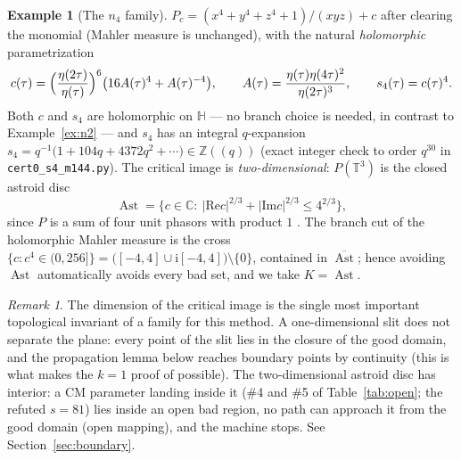 \documentclass[11pt]{article}
\newcommand{\Cc}{\mathbb{C}}
\newcommand{\Zz}{\mathbb{Z}}
\newcommand{\Hh}{\mathbb{H}}
\newcommand{\Tt}{\mathbb{T}}
\newcommand{\ii}{\mathrm{i}}
\newcommand{\ReT}{\mathrm{Re}}
\newcommand{\ImT}{\mathrm{Im}}
\DeclareMathOperator{\Ast}{Ast}
\theoremstyle{definition}
\newtheorem{example}[theorem]{Example}
\theoremstyle{remark}
\newtheorem{remark}[theorem]{Remark}
\begin{document}
\begin{example}[The $n_4$ family]\label{ex:n4}
$P_c=(x^4+y^4+z^4+1)/(xyz)+c$ after clearing the monomial (Mahler
measure is unchanged), with the natural \emph{holomorphic}
parametrization
\begin{equation}\label{eq:cdef}
  c(\tau)=\Bigl(\frac{\eta(2\tau)}{\eta(\tau)}\Bigr)^{6}
   \bigl(16A(\tau)^4+A(\tau)^{-4}\bigr),\qquad
  A(\tau)=\frac{\eta(\tau)\eta(4\tau)^2}{\eta(2\tau)^3},\qquad
  s_4(\tau)=c(\tau)^4 .
\end{equation}
Both $c$ and $s_4$ are holomorphic on $\Hh$ --- no branch choice is
needed, in contrast to Example~\ref{ex:n2} --- and $s_4$ has an
integral $q$-expansion
$s_4=q^{-1}\bigl(1+104q+4372q^2+\cdots\bigr)\in\Zz(\!(q)\!)$
(exact integer check to order $q^{30}$ in
\texttt{cert0\_s4\_m144.py}). The critical image is
\emph{two-dimensional}: $P(\Tt^3)$ is the closed astroid disc
\begin{equation}\label{eq:astroid}
  \Ast=\bigl\{c\in\Cc:\ |\ReT c|^{2/3}+|\ImT c|^{2/3}\le 4^{2/3}\bigr\},
\end{equation}
since $P$ is a sum of four unit phasors with product $1$
\cite{Zf2}. The branch cut of the holomorphic Mahler measure is the
cross $\{c:c^4\in(0,256]\}=\bigl([-4,4]\cup\ii[-4,4]\bigr)
\setminus\{0\}$, contained in $\overline{\Ast}$; hence avoiding
$\Ast$ automatically avoids every bad set, and we take $K=\Ast$.
\end{example}

\begin{remark}\label{rem:2D}
The dimension of the critical image is the single most important
topological invariant of a family for this method. A one-dimensional
slit does not separate the plane: every point of the slit lies in the
closure of the good domain, and the propagation lemma below reaches
boundary points by continuity (this is what makes the $k=1$ proof of
\cite{Zf} possible). The two-dimensional astroid disc has interior:
a CM parameter landing inside it (\#4 and \#5 of
Table~\ref{tab:open}; the refuted $s=81$) lies inside an open bad
region, no path can approach it from the good domain (open mapping),
and the machine stops. See Section~\ref{sec:boundary}.
\end{remark}
\end{document}
